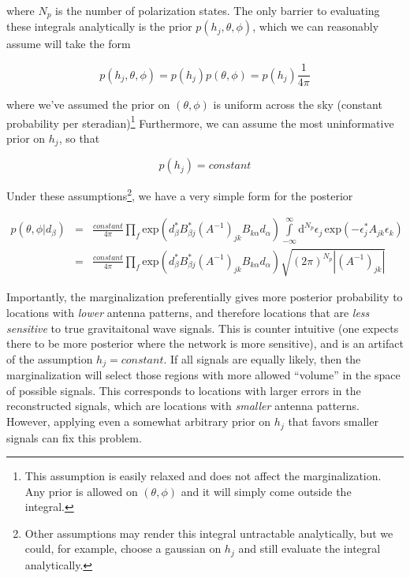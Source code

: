 \documentclass[10pt]{article}
\begin{document}
where $N_p$ is the number of polarization states. The only barrier to evaluating these integrals analytically is the prior $p(h_j, \theta, \phi)$, which we can reasonably assume will take the form

\begin{equation}
p(h_j, \theta, \phi) = p(h_j) p(\theta,\phi) = p(h_j) \frac{1}{4\pi}
\end{equation}

where we've assumed the prior on $(\theta, \phi)$ is uniform across the sky (constant probability per steradian)\footnote{This assumption is easily relaxed and does not affect the marginalization. Any prior is allowed on $(\theta,\phi)$ and it will simply come outside the integral.} Furthermore, we can assume the most uninformative prior on $h_j$, so that

\begin{equation}
p(h_j) = constant
\end{equation}

Under these assumptions\footnote{Other assumptions may render this integral untractable analytically, but we could, for example, choose a gaussian on $h_j$ and still evaluate the integral analytically.}, we have a very simple form for the posterior

\begin{eqnarray}
p(\theta, \phi|d_\beta) & = & \frac{constant}{4\pi}\prod\limits_{f} \mathrm{exp}\left( d_\beta^\ast B_{\beta j}^\ast \left(A^{-1}\right)_{jk} B_{k\alpha} d_\alpha \right) \int\limits_{-\infty}^{\infty}\mathrm{d}^{N_p} \epsilon_j\, \mathrm{exp}\left(- \epsilon_j^\ast A_{jk} \epsilon_k \right) \\
 & = & \frac{constant}{4\pi}\prod\limits_{f} \mathrm{exp}\left( d_\beta^\ast B_{\beta j}^\ast \left(A^{-1}\right)_{jk} B_{k\alpha} d_\alpha \right) \sqrt{(2\pi)^{N_p}\left|\left(A^{-1}\right)_{jk}\right|}
\end{eqnarray}

Importantly, the marginalization preferentially gives more posterior probability to locations with \emph{lower} antenna patterns, and therefore locations that are \emph{less sensitive} to true gravitaitonal wave signals. This is counter intuitive (one expects there to be more posterior where the network is more sensitive), and is an artifact of the assumption $h_j = constant$. If all signals are equally likely, then the marginalization will select those regions with more allowed ``volume'' in the space of possible signals. This corresponds to locations with larger errors in the reconstructed signals, which are locations with \emph{smaller} antenna patterns. However, applying even a somewhat arbitrary prior on $h_j$ that favors smaller signals can fix this problem.
\end{document}
